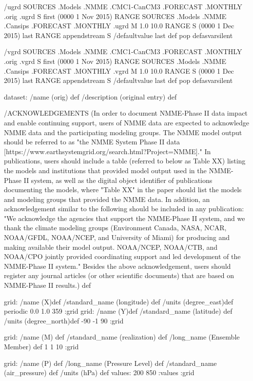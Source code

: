 \begin{ingrid}
/ugrd {
 SOURCES .Models .NMME .CMC1-CanCM3 .FORECAST .MONTHLY .orig .ugrd 
S first (0000 1 Nov 2015) RANGE
 SOURCES .Models .NMME .Cansips .FORECAST .MONTHLY .ugrd
 M 1.0 10.0 RANGE
S (0000 1 Dec 2015) last RANGE
appendstream
S /defaultvalue last def pop
} defasvarsilent

/vgrd {
 SOURCES .Models .NMME .CMC1-CanCM3 .FORECAST .MONTHLY .orig .vgrd 
S first (0000 1 Nov 2015) RANGE
 SOURCES .Models .NMME .Cansips .FORECAST .MONTHLY .vgrd
 M 1.0 10.0 RANGE
S (0000 1 Dec 2015) last RANGE
appendstream
S /defaultvalue last def pop
} defasvarsilent


dataset:
/name (orig) def
/description (original entry) def

/ACKNOWLEDGEMENTS (In order to document NMME-Phase II data impact and enable continuing support, users of NMME data are expected to acknowledge NMME data and the participating modeling groups. The NMME model output should be referred to as "the NMME System Phase II data [https://www.earthsystemgrid.org/search.html?Project=NMME]."  In publications, users should include a table (referred to below as Table XX) listing the models and institutions that provided model output used in the NMME-Phase II system, as well as the digital object identifier of publications documenting the models, where "Table XX" in the paper should list the models and modeling groups that provided the NMME data.  In addition, an acknowledgement similar to the following should be included in any publication:  "We acknowledge the agencies that support the NMME-Phase II system, and we thank the climate modeling groups (Environment Canada, NASA, NCAR, NOAA/GFDL, NOAA/NCEP, and University of Miami) for producing and making available their model output. NOAA/NCEP, NOAA/CTB, and NOAA/CPO jointly provided coordinating support and led development of the NMME-Phase II system."  Besides the above acknowledgement, users should register any journal articles (or other scientific documents) that are based on NMME-Phase II results.) def

grid:
/name (X)def
/standard_name (longitude) def
/units (degree_east)def
periodic
 0.0 1.0 359
:grid
grid:
/name (Y)def
/standard_name (latitude) def
/units (degree_north)def
-90 -1 90
:grid

grid:
/name (M) def
/standard_name (realization) def
/long_name (Ensemble Member) def
1 1 10
:grid

grid:
/name (P) def
/long_name (Pressure Level) def
/standard_name (air_pressure) def
/units (hPa) def
values: 200 850 :values
:grid 


\end{ingrid}

